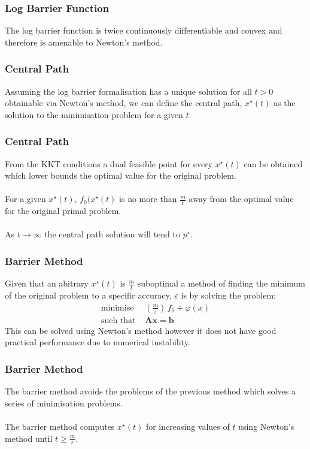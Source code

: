 \documentclass{beamer}
\begin{document}
\begin{frame}
    \frametitle{Log Barrier Function}
    The log barrier function is twice continuously differentiable and convex
    and therefore is amenable to Newton's method.
\end{frame}


\begin{frame}
    \frametitle{Central Path}
    Assuming the log barrier formalisation has a unique solution for all
    $t > 0$ obtainable via Newton's method, we can define the central path,
    $x^{\star}(t)$ as the solution to the minimisation problem for a given
    $t$.
\end{frame}

\begin{frame}
    \frametitle{Central Path}
    From the KKT conditions a dual feasible point for every
    $x^{\star}(t)$ can be obtained which lower bounds the optimal value for
    the original problem.
    \\~\\
    For a given $x^{\star}(t)$, $f_{0}(x^{\star}(t)$ is no more than
    $\frac{m}{t}$ away from the optimal value for the original primal problem.
    \\~\\
    As $t \rightarrow \infty$ the central path solution will tend to
    $p^{\star}$.
\end{frame}

\begin{frame}
    \frametitle{Barrier Method}
    Given that an abitrary $x^{\star}(t)$ is $\frac{m}{t}$ suboptimal a method of
    finding the minimum of the original problem to a specific accuracy,
    $\varepsilon$ is by solving the problem:
    \begin{align*}
        \text{minimise } \, &\left(\frac{m}{\varepsilon}\right)\,f_{0} +
        \varphi(x)\\
        \text{such that } & \mathbf{A}\mathbf{x} =\mathbf{b}
    \end{align*}
    This can be solved using Newton's method however it does not have good
    practical performance due to numerical instability.
\end{frame}

\begin{frame}
    \frametitle{Barrier Method}
    The barrier method avoids the problems of the previous method which solves a
    series of minimisation problems.
    \\~\\
    The barrier method computes $x^{\star}(t)$ for increasing values of
    $t$ using Newton's method until $t \geq \frac{m}{\varepsilon}$.
\end{frame}
\end{document}
